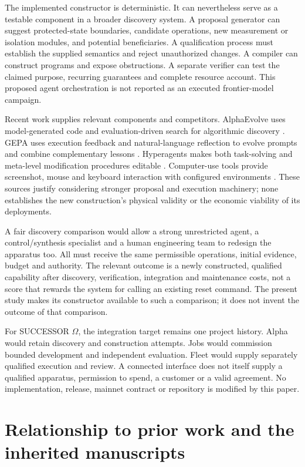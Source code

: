 \documentclass[11pt,letterpaper]{article}
\theoremstyle{definition}\newtheorem{definition}[theorem]{Definition}
\theoremstyle{remark}\newtheorem{remark}[theorem]{Remark}
\newcommand{\Om}{SUCCESSOR $\Omega$}
\begin{document}
The implemented constructor is deterministic. It can nevertheless serve as a testable component in a broader discovery system. A proposal generator can suggest protected-state boundaries, candidate operations, new measurement or isolation modules, and potential beneficiaries. A qualification process must establish the supplied semantics and reject unauthorized changes. A compiler can construct programs and expose obstructions. A separate verifier can test the claimed purpose, recurring guarantees and complete resource account. This proposed agent orchestration is not reported as an executed frontier-model campaign.

Recent work supplies relevant components and competitors. AlphaEvolve uses model-generated code and evaluation-driven search for algorithmic discovery \cite{alphaevolve}. GEPA uses execution feedback and natural-language reflection to evolve prompts and combine complementary lessons \cite{gepa}. Hyperagents makes both task-solving and meta-level modification procedures editable \cite{hyperagents}. Computer-use tools provide screenshot, mouse and keyboard interaction with configured environments \cite{computeruse}. These sources justify considering stronger proposal and execution machinery; none establishes the new construction's physical validity or the economic viability of its deployments.

A fair discovery comparison would allow a strong unrestricted agent, a control/synthesis specialist and a human engineering team to redesign the apparatus too. All must receive the same permissible operations, initial evidence, budget and authority. The relevant outcome is a newly constructed, qualified capability after discovery, verification, integration and maintenance costs, not a score that rewards the system for calling an existing reset command. The present study makes its constructor available to such a comparison; it does not invent the outcome of that comparison.

For \Om, the integration target remains one project history. Alpha would retain discovery and construction attempts. Jobs would commission bounded development and independent evaluation. Fleet would supply separately qualified execution and review. A connected interface does not itself supply a qualified apparatus, permission to spend, a customer or a valid agreement. No implementation, release, mainnet contract or repository is modified by this paper.

\section{Relationship to prior work and the inherited manuscripts}
\label{sec:related}
\end{document}
